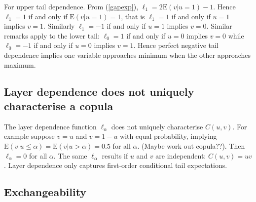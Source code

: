 \documentclass[authoryear]{elsarticle}
\newcommand{\E}{{\mathrm E}}
\newcommand{\eref}[1]{(\ref{#1})}
\begin{document}
For upper tail dependence.  From \eref{gapexp},  $\ell_1=2\E(v|u=1)-1$.  Hence $\ell_1=1$ if and only if $\E(v|u=1)=1$, that is $\ell_1=1$ if and only if $u=1$ implies $v=1$.   Similarly $\ell_1=-1$ if and only if $u=1$ implies $v=0$.
Similar remarks apply to the lower tail:   $\ell_0=1$ if and only if $u=0$ implies $v=0$ while $\ell_0=-1$ if and only if $u=0$ implies $v=1$.
 Hence perfect negative tail dependence implies one variable approaches minimum when the other approaches maximum.



\subsection{Layer dependence does not uniquely characterise a copula}

The layer dependence  function $\ell_\alpha$ does not uniquely characterise $C(u,v)$.  For example suppose $v=u$ and $v=1-u$ with equal probability, implying $\E(v|u\leq \alpha)=\E(v|u>\alpha)=0.5$ for all $\alpha$. (Maybe work out copula??).  Then $\ell_\alpha=0$ for all $\alpha$.   The same $\ell_\alpha$ results if $u$ and $v$ are independent: $C(u,v)=uv$.   Layer dependence only captures first-order conditional tail expectations.

\subsection{Exchangeability}
\end{document}
